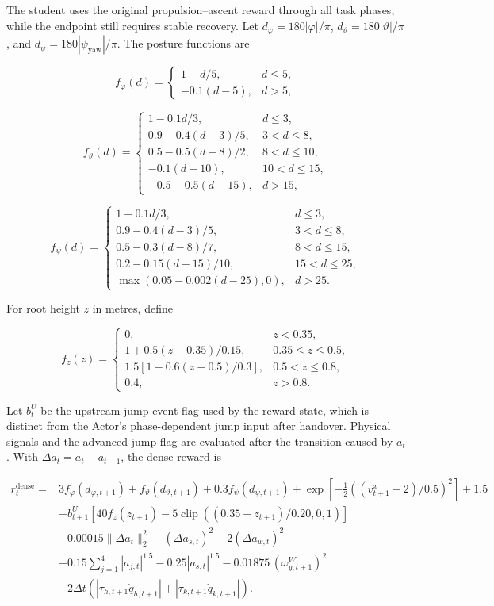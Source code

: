 \documentclass[
  american,
  11pt,
  a4paper,
]{article}
\begin{document}
The student uses the original propulsion--ascent reward through all task
phases, while the endpoint still requires stable recovery. Let
\(d_\varphi=180|\varphi|/\pi\), \(d_\vartheta=180|\vartheta|/\pi\), and
\(d_\psi=180|\psi_{\mathrm{yaw}}|/\pi\). The posture functions are

\[
f_\varphi(d)=
\begin{cases}
1-d/5,&d\le5,\\
-0.1(d-5),&d>5,
\end{cases}
\tag{46}\label{eq:46}
\]

\[
f_\vartheta(d)=
\begin{cases}
1-0.1d/3,&d\le3,\\
0.9-0.4(d-3)/5,&3<d\le8,\\
0.5-0.5(d-8)/2,&8<d\le10,\\
-0.1(d-10),&10<d\le15,\\
-0.5-0.5(d-15),&d>15,
\end{cases}
\tag{47}\label{eq:47}
\]

\[
f_\psi(d)=
\begin{cases}
1-0.1d/3,&d\le3,\\
0.9-0.4(d-3)/5,&3<d\le8,\\
0.5-0.3(d-8)/7,&8<d\le15,\\
0.2-0.15(d-15)/10,&15<d\le25,\\
\max(0.05-0.002(d-25),0),&d>25.
\end{cases}
\tag{48}\label{eq:48}
\]

For root height \(z\) in metres, define

\[
f_z(z)=
\begin{cases}
0,&z<0.35,\\
1+0.5(z-0.35)/0.15,&0.35\le z\le0.5,\\
1.5[1-0.6(z-0.5)/0.3],&0.5<z\le0.8,\\
0.4,&z>0.8.
\end{cases}
\tag{49}\label{eq:49}
\]

Let \(b^U_t\) be the upstream jump-event flag used by the reward state,
which is distinct from the Actor's phase-dependent jump input after
handover. Physical signals and the advanced jump flag are evaluated
after the transition caused by \(a_t\). With \(\Delta a_t=a_t-a_{t-1}\),
the dense reward is

\[
\begin{aligned}
r_t^{\mathrm{dense}}={}&3f_\varphi(d_{\varphi,t+1})+
f_\vartheta(d_{\vartheta,t+1})+0.3f_\psi(d_{\psi,t+1})
+\exp[-\tfrac12((v_{t+1}^x-2)/0.5)^2]+1.5\\
&+b_{t+1}^U\!\left[40f_z(z_{t+1})
-5\operatorname{clip}((0.35-z_{t+1})/0.20,0,1)\right]\\
&-0.00015\|\Delta a_t\|_2^2-(\Delta a_{s,t})^2
-2(\Delta a_{w,t})^2\\
&-0.15\sum_{j=1}^{4}|a_{j,t}|^{1.5}
-0.25|a_{s,t}|^{1.5}
-0.01875\,(\omega_{y,t+1}^{W})^2\\
&-2\Delta t\left(|\tau_{h,t+1}\dot q_{h,t+1}|+
|\tau_{k,t+1}\dot q_{k,t+1}|\right).
\end{aligned}
\tag{50}\label{eq:50}
\]
\end{document}
